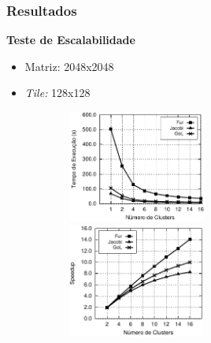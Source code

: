 \documentclass[xcolor={table}]{beamer}
\begin{document}
\begin{frame}\frametitle{Resultados}
    \textbf{Teste de Escalabilidade}
    \begin{itemize}
        \item Matriz: 2048x2048
        \item \textit{Tile:} 128x128
    \end{itemize}
    \begin{figure}
        \centering
        \begin{subfigure}{\textwidth}
            \centering
            \includegraphics[width=0.50\textwidth]{figs/MPPAPlotScalability.pdf}
            \includegraphics[width=0.49\textwidth]{figs/MPPAPlotSpeedup.pdf}
        \end{subfigure}
    \end{figure}
\end{frame}
\end{document}
